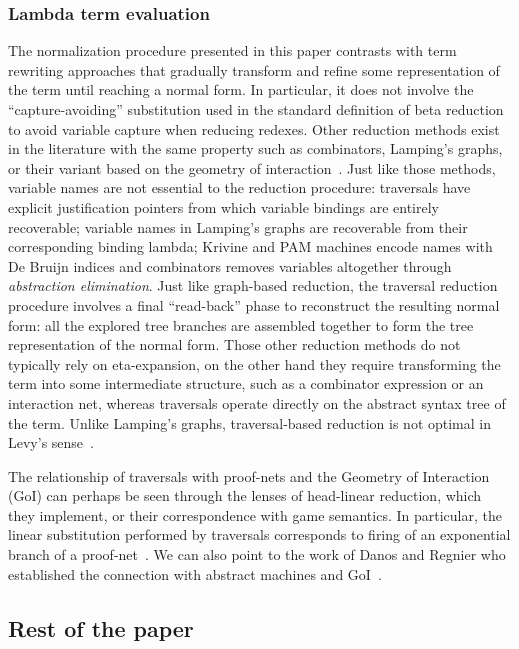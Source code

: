 \documentclass{elsarticle}
\theoremstyle{plain}
\theoremstyle{definition}
\theoremstyle{remark}
\begin{document}
\subsubsection{Lambda term evaluation}
The normalization procedure presented in this paper contrasts with term rewriting approaches that gradually transform and refine some representation of the term until reaching a normal form. In particular, it does not involve the ``capture-avoiding'' substitution used in the standard definition of beta reduction to avoid variable capture when reducing redexes. Other reduction methods exist in the literature with the same property such as combinators, Lamping's graphs, or their variant based on the geometry of interaction~\cite{Lamping:1989:AOL:96709.96711, Gonthier:1992:GOL:143165.143172, curry_combinatorylogic, Barendregt84, the-implementation-of-functional-programming-languages}.
Just like those methods, variable names are not essential to the reduction procedure: traversals have explicit justification pointers from which variable bindings are entirely recoverable; variable names in Lamping's graphs are recoverable from their corresponding binding lambda;
Krivine and PAM machines encode names with De Bruijn indices
and combinators removes variables altogether through \emph{abstraction elimination}.
Just like graph-based reduction, the traversal reduction procedure involves a final ``read-back'' phase to reconstruct the resulting normal form: all the explored tree branches are assembled together to form the tree representation of the normal form. Those other reduction methods do not typically rely on eta-expansion, on the other hand they require transforming the term into some intermediate structure, such as a combinator expression or an interaction net, whereas traversals operate directly on the abstract syntax tree of the term. Unlike Lamping's graphs, traversal-based reduction is not optimal in Levy's sense~\cite{optimal-reduction-levy}.

The relationship of traversals with proof-nets and the Geometry of Interaction (GoI) can perhaps be seen through the lenses of head-linear reduction, which they implement, or their correspondence with game semantics. In particular, the linear substitution performed by traversals corresponds to firing of an exponential branch of a proof-net~\cite{MASCARI1994111}. We can also point to the work of Danos and Regnier who established the connection with abstract machines and GoI~\cite{danosherbelinregnier1996}.

\subsection{Rest of the paper}
\end{document}
